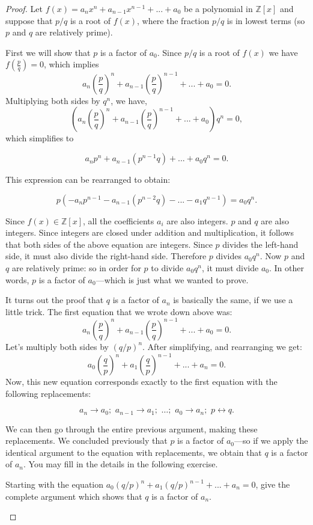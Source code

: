 \begin{proof}{}
Let $f(x) = a_{n}x^n+a_{n-1}x^{n-1}+...+a_{0}$ be a polynomial in $\mathbb{Z}[x]$ and suppose that $p/q$ is a root  of $f(x)$,  where the fraction  $p/q$ is in lowest terms (so $p$ and $q$ are relatively prime).

First we will show that $p$ is a factor of  $a_{0}$. Since $p/q$ is a root of $f(x)$ we have  $f\left(\frac {p}{q}\right)=0$, which implies
$$a_{n}\left(\frac {p}{q}\right)^n+a_{n-1}\left(\frac {p}{q}\right)^{n-1}+...+a_{0}=0.$$
Multiplying both sides by $q^n$, we have,
$$\left(a_{n}\left(\frac {p}{q}\right)^n+a_{n-1}\left(\frac {p}{q}\right)^{n-1}+...+a_{0}\right)q^n=0,$$
which simplifies to

$$a_{n}p^n+a_{n-1}(p^{n-1}q)+...+a_{0}q^n=0.$$

This expression can be rearranged to obtain:

$$p\left(-a_{n}p^{n-1}-a_{n-1}(p^{n-2}q)-...-a_{1}q^{n-1}\right)=a_{0}q^n.$$

Since $f(x) \in \mathbb{Z}[x]$, all the coefficients $a_i$ are also integers.  $p$ and $q$ are also integers. Since integers are closed under addition and multiplication, it follows that both sides of the above equation are integers. Since $p$ divides the left-hand side, it must also divide the right-hand side.  Therefore $p$ divides $a_{0}q^n$. Now $p$ and $q$ are relatively prime: so in order for $p$ to divide $a_{0}q^n$, it must divide $a_0$. 
In other words, $p$ is a factor of  $a_{0}$---which is just what we wanted to prove.

It turns out the proof that $q$ is a factor of  $a_{n}$ is basically the same, if we use a little trick.  The first equation that we wrote down above was:
$$a_{n}\left(\frac {p}{q}\right)^n+a_{n-1}\left(\frac {p}{q}\right)^{n-1}+...+a_{0}=0.$$
Let's multiply both sides by $(q/p)^n$.  After simplifying, and rearranging we get:
$$a_{0}\left(\frac {q}{p}\right)^n+a_{1}\left(\frac {q}{p}\right)^{n-1}+...+a_{n}=0.$$
Now, this new equation corresponds exactly to the first equation with the following replacements:

$$ a_n  \rightarrow a_0;\,\, a_{n-1} \rightarrow a_1;\,\, \ldots;\,\, a_0 \rightarrow a_n; \,\,
p  \leftrightarrow q.$$

We can then go through the entire previous argument, making these replacements.   We concluded previously that $p$ is a factor of $a_0$---so if we apply the identical argument to the equation with replacements, we obtain that $q$ is a factor of $a_n$. You may fill in the details in the following exercise.

\begin{exercise}{}
Starting with the equation $a_{0}\left(q/p\right)^n+a_{1}\left(q/p\right)^{n-1}+...+a_{n}=0$, give the complete argument which shows that 
$q$ is a factor of $a_n$.
\end{exercise}

\end{proof}{}


